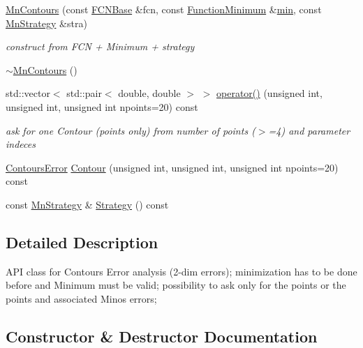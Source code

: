 \begin{DoxyCompactItemize}
\mbox{\hyperlink{classROOT_1_1Minuit2_1_1MnContours_a8f75794bb66e605caabac79cf7a32c77}{Mn\+Contours}} (const \mbox{\hyperlink{classROOT_1_1Minuit2_1_1FCNBase}{F\+C\+N\+Base}} \&fcn, const \mbox{\hyperlink{classROOT_1_1Minuit2_1_1FunctionMinimum}{Function\+Minimum}} \&\mbox{\hyperlink{adat__devel_2lib_2SU3_2SU3__internal_8h_ab0f5fed3171eb00d1c5f037d9f518a23}{min}}, const \mbox{\hyperlink{classROOT_1_1Minuit2_1_1MnStrategy}{Mn\+Strategy}} \&stra)
\begin{DoxyCompactList}\small\item\em construct from F\+CN + Minimum + strategy \end{DoxyCompactList}\item 
\mbox{\hyperlink{classROOT_1_1Minuit2_1_1MnContours_a0764759095adb2129ae9282024af472a}{$\sim$\+Mn\+Contours}} ()
\item 
std\+::vector$<$ std\+::pair$<$ double, double $>$ $>$ \mbox{\hyperlink{classROOT_1_1Minuit2_1_1MnContours_a8d3577d628e22ad0513ed1eb71f8619b}{operator()}} (unsigned int, unsigned int, unsigned int npoints=20) const
\begin{DoxyCompactList}\small\item\em ask for one Contour (points only) from number of points ($>$=4) and parameter indeces \end{DoxyCompactList}\item 
\mbox{\hyperlink{classROOT_1_1Minuit2_1_1ContoursError}{Contours\+Error}} \mbox{\hyperlink{classROOT_1_1Minuit2_1_1MnContours_a8bcd5be6a72acc39c1b56fd45e9958ba}{Contour}} (unsigned int, unsigned int, unsigned int npoints=20) const
\item 
const \mbox{\hyperlink{classROOT_1_1Minuit2_1_1MnStrategy}{Mn\+Strategy}} \& \mbox{\hyperlink{classROOT_1_1Minuit2_1_1MnContours_a79b55e1c06425b314701c4a3e5b7b009}{Strategy}} () const
\end{DoxyCompactItemize}


\subsection{Detailed Description}
A\+PI class for Contours Error analysis (2-\/dim errors); minimization has to be done before and Minimum must be valid; possibility to ask only for the points or the points and associated Minos errors; 

\subsection{Constructor \& Destructor Documentation}
\mbox{\label{classROOT_1_1Minuit2_1_1MnContours_a87d983509ac3ce6f6635407a81e07153}} 
